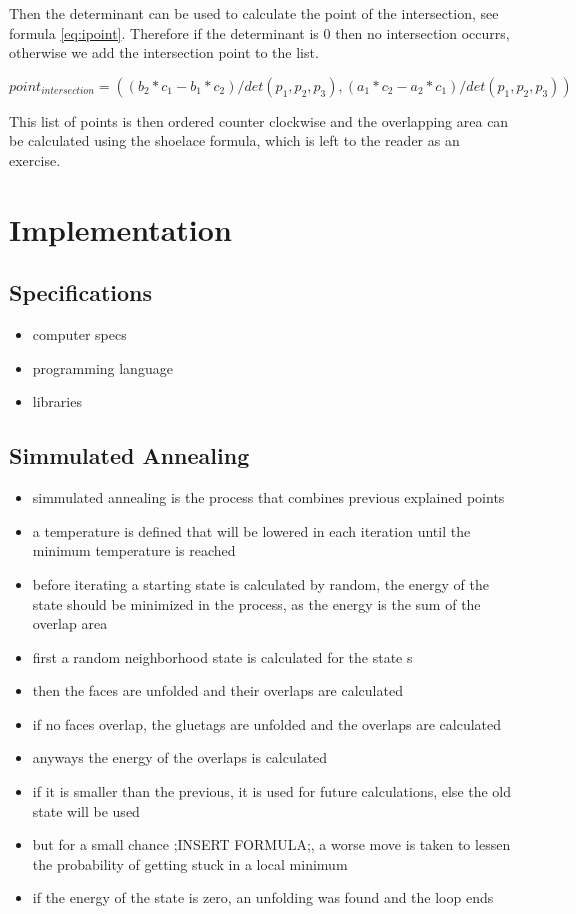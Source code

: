 \documentclass[draft,final]{vutinfth} %
\begin{document}
Then the determinant can be used to calculate the point of the intersection, see formula \ref{eq:ipoint}. Therefore if the determinant is $0$ then no intersection occurrs, otherwise we add the intersection point to the list.

\begin{equation}
\label{eq:ipoint}
point_{intersection} = ((b_2*c_1 - b_1*c_2)/det(p_1, p_2, p_3),(a_1*c_2 - a_2*c_1)/det(p_1, p_2, p_3))
\end{equation}

This list of points is then ordered counter clockwise and the overlapping area can be calculated using the shoelace formula, which is left to the reader as an exercise.

\chapter{Implementation}
\label{chap:Implementation}

\section{Specifications}

\begin{itemize}
	\item computer specs
	\item programming language
	\item libraries
\end{itemize}

\section{Simmulated Annealing}

\begin{itemize}
	\item simmulated annealing is the process that combines previous explained points
	\item a temperature is defined that will be lowered in each iteration until the minimum temperature is reached
	\item before iterating a starting state is calculated by random, the energy of the state should be minimized in the process, as the energy is the sum of the overlap area
	\item first a random neighborhood state is calculated for the state s
	\item then the faces are unfolded and their overlaps are calculated
	\item if no faces overlap, the gluetags are unfolded and the overlaps are calculated
	\item anyways the energy of the overlaps is calculated	
	\item if it is smaller than the previous, it is used for future calculations, else the old state will be used
	\item but for a small chance ;INSERT FORMULA;, a worse move is taken to lessen the probability of getting stuck in a local minimum
	\item if the energy of the state is zero, an unfolding was found and the loop ends
\end{itemize}
\end{document}
